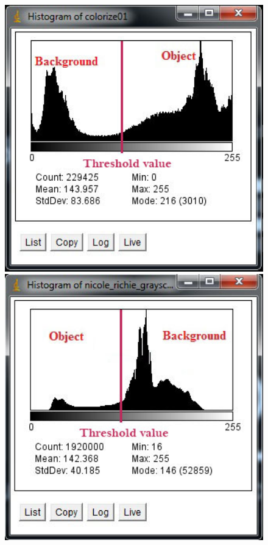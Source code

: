 \begin{figure}[htbp] \centering
\begin{minipage}[b]{0.45\textwidth} \centering
\includegraphics[width=1.00\textwidth]{Pictures/Theory/SimpleThresholdPicture} %
\end{minipage} \hfill
\begin{minipage}[b]{0.45\textwidth} \centering
\includegraphics[width=1.00\textwidth]{Pictures/Theory/ComplicatedThresholdPicture} %

\end{minipage}
\end{figure}
